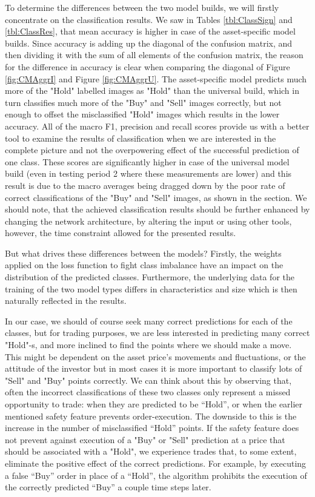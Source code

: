 \documentclass[12pt, a4paper]{article}
\begin{document}
To determine the differences between the two model builds, we will firstly concentrate on the classification results. We saw in Tables \ref{tbl:ClassSign} and \ref{tbl:ClassRes}, that mean accuracy is higher in case of the asset-specific model builds. Since accuracy is adding up the diagonal of the confusion matrix, and then dividing it with the sum of all elements of the confusion matrix, the reason for the difference in accuracy is clear when comparing the diagonal of Figure \ref{fig:CMAggrI} and Figure \ref{fig:CMAggrU}. The asset-specific model predicts much more of the "Hold" labelled images as "Hold" than the universal build, which in turn classifies much more of the "Buy" and "Sell" images correctly, but not enough to offset the misclassified "Hold" images which results in the lower accuracy. All of the macro F1, precision and recall scores provide us with a better tool to examine the results of classification when we are interested in the complete picture and not the overpowering effect of the successful prediction of one class. These scores are significantly higher in case of the universal model build (even in testing period 2 where these measurements are lower) and this result is due to the macro averages being dragged down by the poor rate of correct classifications of the "Buy" and "Sell" images, as shown in the  section. We should note, that the achieved classification results should be further enhanced by changing the network architecture, by altering the input or using other tools, however, the time constraint allowed for the presented results.

But what drives these differences between the models? Firstly, the weights applied on the loss function to fight class imbalance have an impact on the distribution of the predicted classes. Furthermore, the underlying data for the training of the two model types differs in characteristics and size which is then naturally reflected in the results. 

In our case, we should of course seek many correct predictions for each of the classes, but for trading purposes, we are less interested in predicting many correct "Hold"-s, and more inclined to find the points where we should make a move. This might be dependent on the asset price's movements and fluctuations, or the attitude of the investor but in most cases it is more important to classify lots of "Sell" and "Buy" points correctly. 
We can think about this by observing that, often the incorrect classifications of these two classes only represent a missed opportunity to trade: when they are predicted to be “Hold”, or when the earlier mentioned safety feature prevents order-execution. The downside to this is the increase in the number of misclassified “Hold” points. If the safety feature does not prevent against execution of a "Buy" or "Sell" prediction at a price that should be associated with a "Hold", we experience trades that, to some extent, eliminate the positive effect of the correct predictions. For example, by executing a false “Buy” order in place of a “Hold”, the algorithm prohibits the execution of the correctly predicted “Buy” a couple time steps later. 
\end{document}
